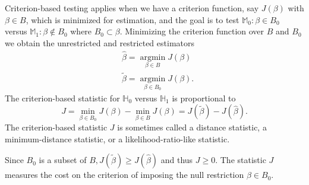 \documentclass[10pt]{article}
\begin{document}
Criterion-based testing applies when we have a criterion function, say $J(\beta)$ with $\beta \in B$, which is minimized for estimation, and the goal is to test $\mathbb{M}_{0}: \beta \in B_{0}$ versus $\mathbb{M}_{1}: \beta \notin B_{0}$ where $B_{0} \subset \beta$. Minimizing the criterion function over $B$ and $B_{0}$ we obtain the unrestricted and restricted estimators
$$
\begin{aligned}
&\widehat{\beta}=\underset{\beta \in B}{\operatorname{argmin}} J(\beta) \\
&\widetilde{\beta}=\underset{\beta \in B_{0}}{\operatorname{argmin}} J(\beta) .
\end{aligned}
$$
The criterion-based statistic for $\mathbb{H}_{0}$ versus $\mathbb{H}_{1}$ is proportional to
$$
J=\min _{\beta \in B_{0}} J(\beta)-\min _{\beta \in B} J(\beta)=J(\widetilde{\beta})-J(\widehat{\beta}) .
$$
The criterion-based statistic $J$ is sometimes called a distance statistic, a minimum-distance statistic, or a likelihood-ratio-like statistic.

Since $B_{0}$ is a subset of $B, J(\widetilde{\beta}) \geq J(\widehat{\beta})$ and thus $J \geq 0$. The statistic $J$ measures the cost on the criterion of imposing the null restriction $\beta \in B_{0}$.
\end{document}
